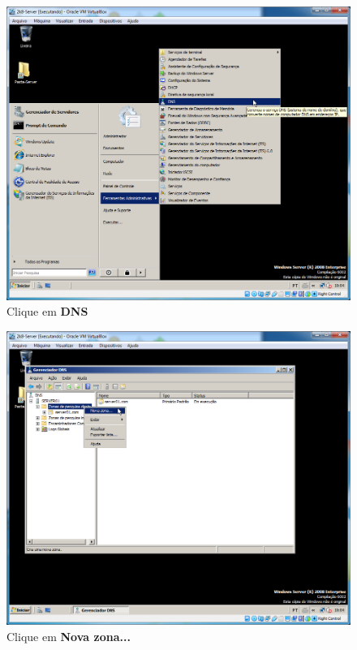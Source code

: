 \documentclass[10pt]{article}
\begin{document}
\begin{figure}[H]
    \centering
    \caption{Clique em \textbf{DNS}}
    \label{fig:5532001}
    \includegraphics[width=\linewidth]{images/IIS/criando_um_novo_site/001.png}
\end{figure}
\begin{figure}[H]
    \centering
    \caption{Clique em \textbf{Nova zona...}}
    \label{fig:5532002}
    \includegraphics[width=\linewidth]{images/IIS/criando_um_novo_site/002.png}
\end{figure}
\end{document}
